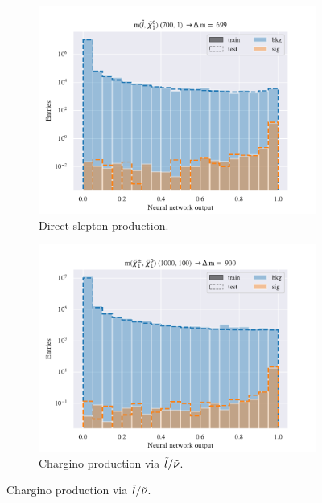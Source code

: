 \begin{figure}[H]
    \centering
    \begin{subfigure}[t!]{0.49\textwidth}
        \includegraphics[width = \textwidth]{Figures/SlepSlep/ML/NN/High_level/High/scaled_train_test_396033.pdf}
        \caption{Direct slepton production.}
        \label{fig:SlepslepNNLow}
    \end{subfigure}
    \begin{subfigure}[t!]{0.49\textwidth}
        \includegraphics[width = \textwidth]{Figures/SlepSnu/NN/High_level/High/scaled_train_test_397169.pdf}
        \caption{Chargino production via $\Tilde{l}/\Tilde{\nu}$.}
        \label{fig:SlepsnuNNLow}
    \end{subfigure}    

\end{figure}
